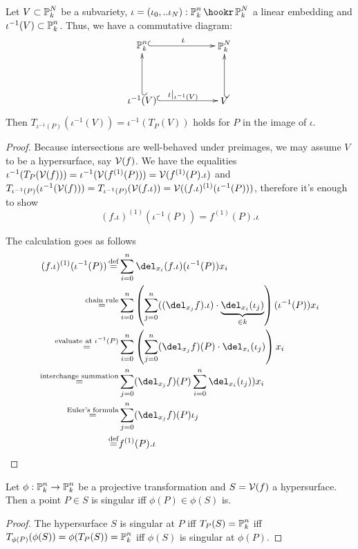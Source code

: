 \begin{proposition} \label{corollaryTangentPullback}
Let $V\subset \operatorname{\mathbb P}^N_k$ be a subvariety, $\iota = (\iota_0,..\iota_N): \proj^n_k \hookr \proj^N_k$ a linear embedding and $\iota^{-1}(V) \subset \operatorname{\mathbb P}^n_k$.
Thus, we have a commutative diagram:
\begin{equation}
\begin{xy}
(0,20)*+{\proj^n_k}="pn";
(30,20)*+{\proj^N_k}="pN";
(0,0)*+{\iota^{-1}(V)}="iv";
(30,0)*+{V}="v";
{\ar@{^{(}->} "pn";"pN"}?*!/_2mm/{\iota};
{\ar@{^{(}->} "iv";"v"}?*!/_2mm/{\iota|_{\iota^{-1}(V)}};
{\ar@{_{(}->} "iv";"pn"};
{\ar@{_{(}->} "v";"pN"};
\end{xy}
\end{equation}
Then $T_{\iota^{-1}(P)}(\iota^{-1}(V)) = \iota^{-1}(T_P(V)) $ holds for $P$ in the image of $\iota$.
\end{proposition}
\begin{proof}
Because intersections are well-behaved under preimages, we may assume $V$ to be a hypersurface, say $\operatorname{\mathcal V}(f)$.
We have the equalities $\iota^{-1}(T_P(\operatorname{\mathcal V}(f))) = \iota^{-1}(\operatorname{\mathcal V}(f^{(1)}(P))) = \operatorname{\mathcal V}(f^{(1)}(P).\iota)$ and $T_{\iota^{-1}(P)}(\iota^{-1}(\operatorname{\mathcal V}(f))) = T_{\iota^{-1}(P)}(\operatorname{\mathcal V}(f.\iota)) = \operatorname{\mathcal V}((f.\iota)^{(1)}(\iota^{-1}(P)))$, therefore it's enough to show
\begin{equation}
(f.\iota)^{(1)}(\iota^{-1}(P))
=
f^{(1)}(P).\iota
\end{equation}

The calculation goes as follows
\begin{align}
(f.\iota)^{(1)}(\iota^{-1}(P))
  \defeq& \sum_{i=0}^n \del_{x_i}(f.\iota)(\iota^{-1}(P))x_i
\\\overset{\text{chain rule}}=& \sum_{i=0}^n \left(\sum_{j=0}^n ((\del_{x_j}f).\iota) \cdot \underset{\in k}{\underbrace{\del_{x_i}(\iota_j)}}\right)(\iota^{-1}(P))x_i
\\\overset{\text{evaluate at }\iota^{-1}(P)}=& \sum_{i=0}^n \left(\sum_{j=0}^n (\del_{x_j}f)(P) \cdot \del_{x_i}(\iota_j)\right)x_i
\\\overset{\text{interchange summation}}=& \sum_{j=0}^n (\del_{x_j}f)(P) \sum_{i=0}^n \del_{x_i}(\iota_j))x_i
\\\overset{\text{Euler's formula}}=& \sum_{j=0}^n (\del_{x_j}f)(P) \iota_j
\\\defeq& f^{(1)}(P).\iota
\end{align}
\end{proof}

\begin{corollary}
Let $\phi : \operatorname{\mathbb P}^n_k \to \operatorname{\mathbb P}^n_k$ be a projective transformation and $S = \operatorname{\mathcal V}(f)$ a hypersurface.
Then a point $P \in S$ is singular iff $\phi(P) \in \phi(S)$ is.
\end{corollary}
\begin{proof}
The hypersurface $S$ is singular at $P$ iff $T_P(S) = \operatorname{\mathbb P}^n_k$ iff $T_{\phi(P)}(\phi(S)) = \phi(T_P(S)) = \operatorname{\mathbb P}^n_k$ iff $\phi(S)$ is singular at $\phi(P)$.
\end{proof}

